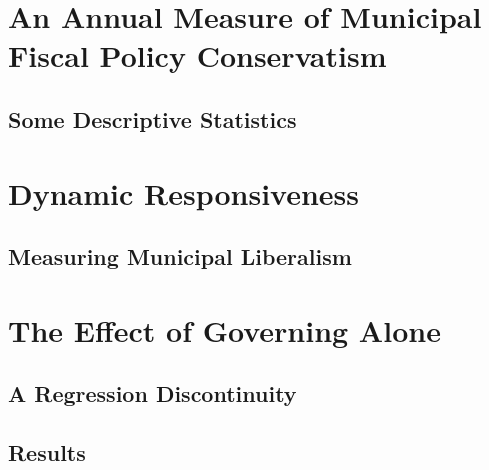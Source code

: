 \documentclass[a4paper,11pt]{article}
\begin{document}
\section{An Annual Measure of Municipal Fiscal Policy Conservatism}

\subsection{Some Descriptive Statistics}

\section{Dynamic Responsiveness}

\subsection{Measuring Municipal Liberalism}

\section{The Effect of Governing Alone}

\subsection{A Regression Discontinuity}

\subsection{Results}
	
	
\end{document}
